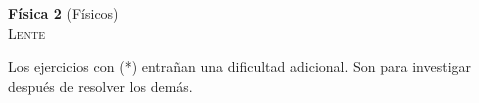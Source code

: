 \documentclass[11pt,spanish,a4paper]{article}
\begin{document}
\begin{center}
	\textbf{Física 2} (Físicos) \hfill {}\\
	\textsc{\LARGE Lente}
\end{center}

Los ejercicios con (*) entrañan una dificultad adicional. Son para investigar después de resolver los demás.


\begin{enumerate}
								







\end{enumerate}
\end{document}
